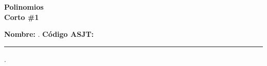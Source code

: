 \begin{center} \textbf
{
    \Large Polinomios \\ \vspace{2mm}Corto \#1
}
\end{center}

\vspace{8mm}

\textbf{Nombre:} \hrulefill.
\textbf{Código ASJT:} \rule{4cm}{0.1mm}.

\thispagestyle{first-page-style}
